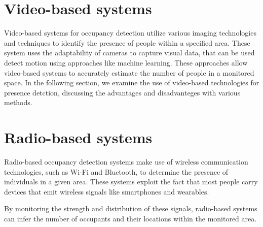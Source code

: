 
\section{Video-based systems}\label{sec:presence_video}
Video-based systems for occupancy detection utilize various imaging technologies and techniques to identify the presence of people within a specified area. 
These system uses the adaptability of cameras to capture visual data, that can be used detect motion using approaches like machine learning. 
These approaches allow video-based systems to accurately estimate the number of people in a monitored space.
In the following section, we examine the use of video-based technologies for presence detction, discussing the advantages and disadvanteges with various methods.


\section{Radio-based systems}\label{sec:presence_radio}
Radio-based occupancy detection systems make use of wireless communication technologies, such as Wi-Fi and Bluetooth, to determine the presence of individuals in a given area.
These systems exploit the fact that most people carry devices that emit wireless signals like smartphones and wearables.

By monitoring the strength and distribution of these signals, radio-based systems can infer the number of occupants and their locations within the monitored area.\cite{longoAccurateOccupancyEstimation2019, teissedre-2019}
